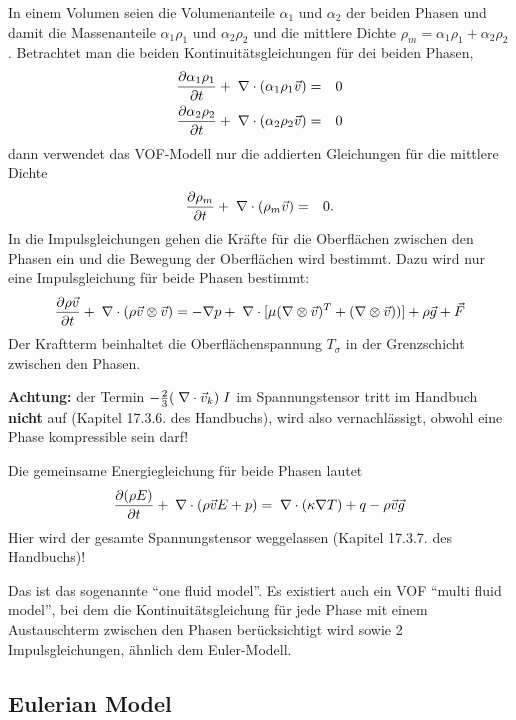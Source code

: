 In einem Volumen seien die Volumenanteile $\alpha_1$ und $\alpha_2$
der beiden Phasen und damit die Massenanteile $\alpha_1\rho_1$ und
$\alpha_2\rho_2$ und die mittlere Dichte $\rho_m = \alpha_1\rho_1 +
\alpha_2\rho_2$. Betrachtet man die beiden Kontinuitätsgleichungen für
dei beiden Phasen,
\begin{eqnarray*}
\frac{\partial \alpha_1 \rho_1 }{\partial t} + \;\nabla \cdot (\alpha_1\rho_1 \vec{v}) 
&=& 0\\
\frac{\partial \alpha_2 \rho_2 }{\partial t} + \;\nabla \cdot (\alpha_2\rho_2 \vec{v}) 
&=& 0
\end{eqnarray*}
dann verwendet das VOF-Modell nur die addierten Gleichungen für die
mittlere Dichte
\begin{eqnarray*}
\frac{\partial \rho_m }{\partial t} + \;\nabla \cdot (\rho_m \vec{v}) 
&=& 0.
\end{eqnarray*}
In die Impulsgleichungen gehen die Kräfte für die Oberflächen zwischen
den Phasen ein und die Bewegung der Oberflächen wird bestimmt. Dazu
wird nur eine Impulsgleichung für beide Phasen bestimmt:
\[
\frac{\partial \rho \vec{v}}{\partial t} + \;\nabla \cdot (\rho
\vec{v}\otimes\vec{v}) = - \nabla p + \;\nabla \cdot [\mu ( \nabla \otimes
\vec{v})^T + (\nabla \otimes \vec{v}))] + \rho \vec{g} + \vec{F}
\]
Der Kraftterm beinhaltet die Oberflächenspannung $T_\sigma$ in der
Grenzschicht zwischen den Phasen.


{\bf Achtung:} der Termin $-\frac{2}{3} (\;\nabla \cdot \vec{v}_k)\; I $ im
Spannungstensor tritt im Handbuch {\bf nicht} auf (Kapitel 17.3.6. des
Handbuchs), wird also vernachlässigt, obwohl eine Phase kompressible
sein darf!

Die gemeinsame Energiegleichung für beide Phasen lautet
\begin{equation}
\frac{\partial (\rho E)}{\partial t} + \;\nabla \cdot (\rho \vec{v} E + p) = \;\nabla \cdot
(\kappa \nabla T) + q - \rho \vec{v}\vec{g} 
\end{equation}
Hier wird der gesamte Spannungstensor weggelassen (Kapitel 17.3.7. des
Handbuchs)!

Das ist das sogenannte ``one fluid model''. Es existiert auch ein VOF
``multi fluid model'', bei dem die Kontinuitätsgleichung für jede
Phase mit einem Austauschterm zwischen den Phasen berücksichtigt wird
sowie 2 Impulsgleichungen, ähnlich dem Euler-Modell.


\subsection{\bf Eulerian Model} \label{subsec:Euler}


